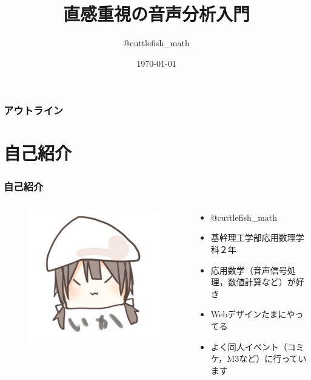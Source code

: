 \documentclass[unicode,11pt]{beamer}
\title{直感重視の音声分析入門}
\author{@cuttlefish\_math}
\date{\today}
\institute{基幹理工学部 応用数理学科 2年}
\begin{document}
\begin{frame}
  \titlepage
\end{frame}

\begin{frame}
  \frametitle{アウトライン}
  \begin{multicols}{2}
    \tableofcontents
  \end{multicols}
\end{frame}

\section{自己紹介}
\begin{frame}
  \frametitle{自己紹介}
  \begin{columns}
    \begin{column}{0.3\textwidth}
      \begin{figure}
        \centering
        \includegraphics[width=\columnwidth,pagebox=cropbox]{./figure/cuttlefish_math.jpeg}
      \end{figure}
    \end{column}
    \begin{column}{0.7\textwidth}
      \begin{itemize}
        \item @cuttlefish\_math
        \item 基幹理工学部応用数理学科２年
        \item 応用数学（音声信号処理，数値計算など）が好き
        \item Webデザインたまにやってる
        \item よく同人イベント（コミケ，M3など）に行っています
      \end{itemize}
    \end{column}
  \end{columns}
\end{frame}
\end{document}
